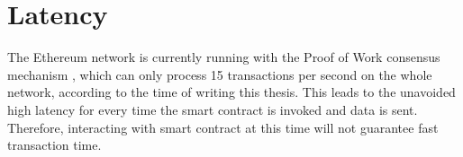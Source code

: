 \section{Latency}

The Ethereum network is currently running with the Proof of Work consensus mechanism \citep{RefWorks:doc:BitcoinWhitepaper}, which can only process 15 transactions per second on the whole network, according to the time of writing this thesis. This leads to the unavoided high latency for every time the smart contract is invoked and data is sent. Therefore, interacting with smart contract at this time will not guarantee fast transaction time.